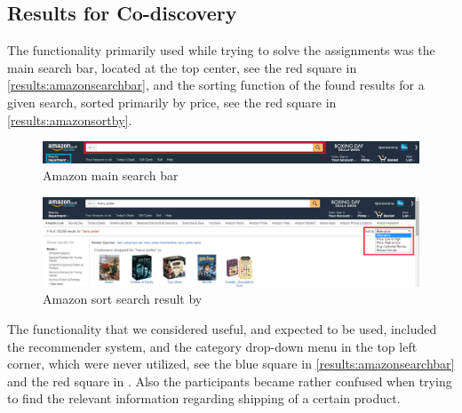 \subsection{Results for Co-discovery}
The functionality primarily used while trying to solve the assignments was the main search bar, located at the top center, see the red square in \autoref{results:amazonsearchbar}, and the sorting function of the found results for a given search, sorted primarily by price, see the red square in \autoref{results:amazonsortby}.

\begin{figure}[h]
\includegraphics[scale=0.3]{./includes/amazon_search_bar.png}
\caption{Amazon main search bar}
\label{results:amazonsearchbar}
\end{figure}

\begin{figure}[h]
\includegraphics[scale=0.3]{./includes/amazon_sort_by.png}
\caption{Amazon sort search result by}
\label{results:amazonsortby}
\end{figure}

The functionality that we considered useful, and expected to be used, included the recommender system, and the category drop-down menu in the top left corner, which were never utilized, see the blue square in \autoref{results:amazonsearchbar} and the red square in . Also the participants became rather confused when trying to find the relevant information regarding shipping of a certain product.

